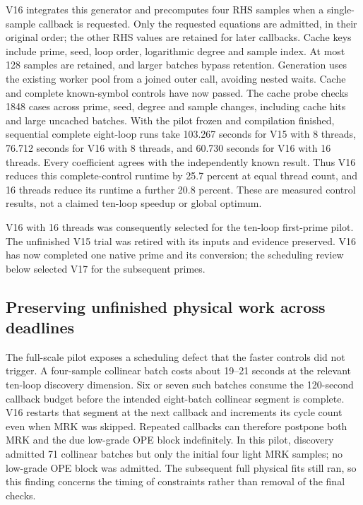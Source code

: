 \documentclass[11pt]{article}
\begin{document}
V16 integrates this generator and precomputes four RHS samples when a
single-sample callback is requested. Only the requested equations are
admitted, in their original order; the other RHS values are retained for
later callbacks. Cache keys include prime, seed, loop order, logarithmic
degree and sample index. At most 128 samples are retained, and larger
batches bypass retention. Generation uses the existing worker pool from a
joined outer call, avoiding nested waits. Cache and complete known-symbol
controls have now passed. The cache probe checks 1848 cases across prime,
seed, degree and sample changes, including cache hits and large uncached
batches. With the pilot frozen and compilation finished, sequential complete
eight-loop runs take 103.267 seconds for V15 with 8 threads, 76.712 seconds
for V16 with 8 threads, and 60.730 seconds for V16 with 16 threads. Every
coefficient agrees with the independently known result. Thus V16 reduces
this complete-control runtime by 25.7 percent at equal thread count, and
16 threads reduce its runtime a further 20.8 percent. These are measured
control results, not a claimed ten-loop speedup or global optimum.

V16 with 16 threads was consequently selected for the ten-loop first-prime
pilot. The unfinished V15 trial was retired with its inputs and evidence
preserved. V16 has now completed one native prime and its conversion;
the scheduling review below selected V17 for the subsequent primes.

\subsection{Preserving unfinished physical work across deadlines}
The full-scale pilot exposes a scheduling defect that the faster controls
did not trigger. A four-sample collinear batch costs about 19--21 seconds
at the relevant ten-loop discovery dimension. Six or seven such batches
consume the 120-second callback budget before the intended eight-batch
collinear segment is complete. V16 restarts that segment at the next
callback and increments its cycle count even when MRK was skipped. Repeated
callbacks can therefore postpone both MRK and the due low-grade OPE block
indefinitely. In this pilot, discovery admitted 71 collinear batches but
only the initial four light MRK samples; no low-grade OPE block was admitted.
The subsequent full physical fits still ran, so this finding concerns
the timing of constraints rather than removal of the final checks.
\end{document}

